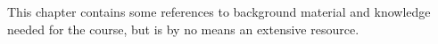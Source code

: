 \documentclass[../main.tex]{subfile}
\begin{document}
  This chapter contains some references to background material and knowledge needed for the course, but is by no means an extensive resource.
\end{document}
